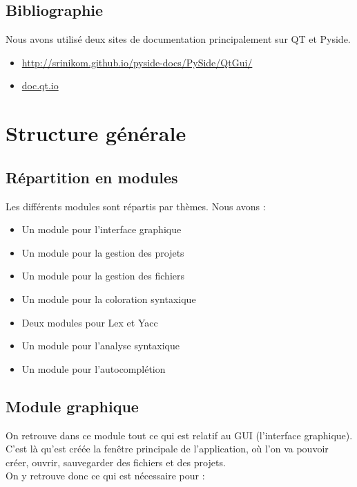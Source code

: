 \documentclass[a4paper,12pt]{article}
\begin{document}
	\subsection{Bibliographie}
	
	Nous avons utilisé deux sites de documentation principalement sur QT et Pyside.
	\begin{itemize}
		\item \url{http://srinikom.github.io/pyside-docs/PySide/QtGui/}
		\item \url{doc.qt.io}
	\end{itemize}
	
\section{Structure générale}

	\subsection{Répartition en modules}
	
		Les différents modules sont répartis par thèmes. Nous avons :
		\begin{itemize}
			\item Un module pour l'interface graphique
			\item Un module pour la gestion des projets
			\item Un module pour la gestion des fichiers
			\item Un module pour la coloration syntaxique
			\item Deux modules pour Lex et Yacc
			\item Un module pour l'analyse syntaxique
			\item Un module pour l'autocomplétion
		\end{itemize}
	
	\subsection{Module graphique}
	
		On retrouve dans ce module tout ce qui est relatif au GUI (l'interface graphique).\\
		C'est là qu'est créée la fenêtre principale de l'application, où l'on va pouvoir créer, ouvrir, sauvegarder des fichiers et des projets.\\
		
		On y retrouve donc ce qui est nécessaire pour :
		
\end{document}
